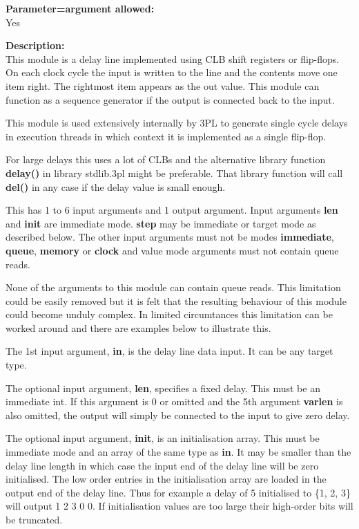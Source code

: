         {\bf Parameter=argument allowed:} \\
        Yes
        
        {\bf Description:} \\
        This module is a delay line implemented using CLB shift registers or
        flip-flops. On each clock cycle the input is written to the line and the
        contents move one item right. The rightmost item appears as the out
        value. This module can function as a sequence generator if the output
        is connected back to the input.
        
        This module is used extensively internally by 3PL to generate single
        cycle delays in execution threads in which context it is implemented as
        a single flip-flop.
        
        For large delays this uses a lot of CLBs and the alternative library
        function {\bf delay()}  in library stdlib.3pl
        might be preferable. That library function will call {\bf del()}
        in any case if the delay value is small enough.

        This has 1 to 6 input arguments and 1 output argument. Input arguments
        {\bf len} and {\bf init} are immediate mode. {\bf step} may be
        immediate or target mode as described below. The other input arguments
        must not be modes {\bf immediate}, {\bf queue}, {\bf memory} or {\bf
        clock} and value mode arguments must not contain queue reads.
        
        None of the arguments to this module can contain queue reads. This
        limitation could be easily removed but it is felt that the resulting
        behaviour of this module could become unduly complex. In limited
        circumtances this limitation can be worked around and there are examples
        below to illustrate this.

        The 1st input argument, {\bf in}, is the delay line data input. It can
        be any target type.

        The optional input argument, {\bf len}, specifies a fixed delay.
        This must be an immediate int. If this argument is 0 or omitted and the
        5th argument {\bf varlen} is also omitted, the output will simply be
        connected to the input to give zero delay.

        The optional input argument, {\bf init}, is an initialisation array.
        This  must be immediate mode and an array of the same type as {\bf in}.
        It may be smaller than the delay line length in which case the input end
        of the delay line will be zero initialised. The low order entries in
        the initialisation array are loaded in the output end of the delay line.
        Thus for example a delay of 5 initialised to \{1, 2, 3\} will output
        1 2 3 0 0.
        If initialisation values are too large their high-order bits will be
        truncated.

